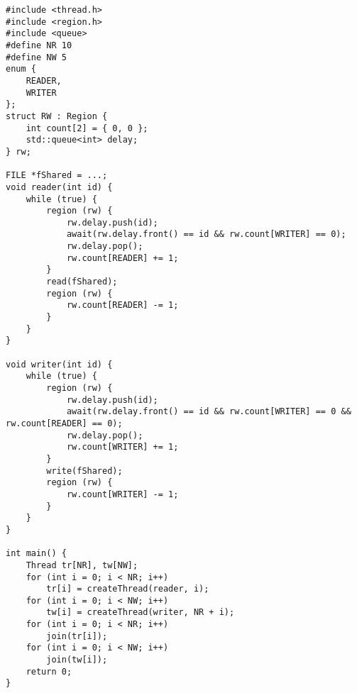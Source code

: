 \begin{lstlisting}
#include <thread.h>
#include <region.h>
#include <queue>
#define NR 10
#define NW 5
enum {
    READER,
    WRITER
};
struct RW : Region {
    int count[2] = { 0, 0 };
    std::queue<int> delay;
} rw;

FILE *fShared = ...;
void reader(int id) {
    while (true) {
        region (rw) {
            rw.delay.push(id);
            await(rw.delay.front() == id && rw.count[WRITER] == 0);
            rw.delay.pop();
            rw.count[READER] += 1;
        }
        read(fShared);
        region (rw) {
            rw.count[READER] -= 1;
        }
    }
}

void writer(int id) {
    while (true) {
        region (rw) {
            rw.delay.push(id);
            await(rw.delay.front() == id && rw.count[WRITER] == 0 && rw.count[READER] == 0);
            rw.delay.pop();
            rw.count[WRITER] += 1;
        }
        write(fShared);
        region (rw) {
            rw.count[WRITER] -= 1;
        }
    }
}

int main() {
    Thread tr[NR], tw[NW];
    for (int i = 0; i < NR; i++) 
        tr[i] = createThread(reader, i);
    for (int i = 0; i < NW; i++) 
        tw[i] = createThread(writer, NR + i);
    for (int i = 0; i < NR; i++) 
        join(tr[i]);
    for (int i = 0; i < NW; i++) 
        join(tw[i]);
    return 0;
}

\end{lstlisting}